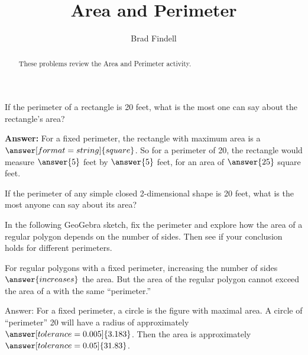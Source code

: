 \documentclass[nooutcomes]{ximera}
\title{Area and Perimeter}
\author{Brad Findell}
\begin{document}
\begin{abstract}
These problems review the Area and Perimeter activity.  
\end{abstract}
\maketitle

%
%
%
%

\begin{problem}
If the perimeter of a rectangle is 20 feet, what is the most one can say about the rectangle's area? 

\textbf{Answer:}  For a fixed perimeter, the rectangle with maximum area is a $\answer[format=string]{square}$.  So for a perimeter of 20, the rectangle would measure $\answer{5}$ feet by $\answer{5}$ feet, for an area of $\answer{25}$ square feet.  

\begin{problem}
If the perimeter of any simple closed 2-dimensional shape is 20 feet, what is the most anyone can say about its area?

In the following GeoGebra sketch, fix the perimeter and explore how the area of a regular polygon depends on the number of sides.  Then see if your conclusion holds for different perimeters.  
\begin{center}  
\end{center}
For regular polygons with a fixed perimeter, increasing the number of sides
$\answer{increases}$ the area.  But the area of the regular polygon cannot 
exceed the area of a 
with the same ``perimeter.''

\begin{problem}
Answer: For a fixed perimeter, a circle is the figure with maximal area.  A circle of ``perimeter'' 20 will have a radius of approximately $\answer[tolerance=0.005]{3.183}$. %
Then the area is approximately $\answer[tolerance=0.05]{31.83}$. %
\end{problem}
\end{problem}
\end{problem}
\end{document}
